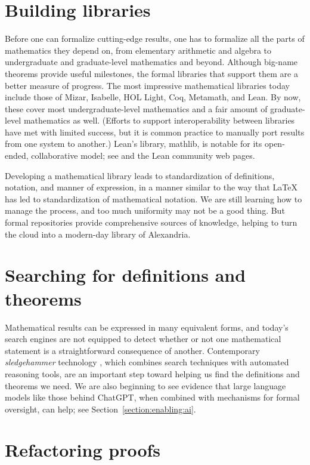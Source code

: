 \documentclass[12pt]{amsart}
\theoremstyle{definition}
\theoremstyle{remark}
\numberwithin{equation}{section}
\begin{document}
\section{Building libraries}

Before one can formalize cutting-edge results, one has to formalize all the parts of mathematics they depend on, from elementary arithmetic and algebra to undergraduate and graduate-level mathematics and beyond. Although big-name theorems provide useful milestones, the formal libraries that support them are a better measure of progress. The most impressive mathematical libraries today include those of Mizar, Isabelle, HOL Light, Coq, Metamath, and Lean. By now, these cover most undergraduate-level mathematics and a fair amount of graduate-level mathematics as well. (Efforts to support interoperability between libraries have met with limited success, but it is common practice to manually port results from one system to another.) Lean's library, mathlib, is notable for its open-ended, collaborative model; see \cite{mathlib:20} and the Lean community web pages.

Developing a mathematical library leads to standardization of definitions, notation, and manner of expression, in a manner similar to the way that \LaTeX{} has led to standardization of mathematical notation. We are still learning how to manage the process, and too much uniformity may not be a good thing. But formal repositories provide comprehensive sources of knowledge, helping to turn the cloud into a modern-day library of Alexandria.


\section{Searching for definitions and theorems}

Mathematical results can be expressed in many equivalent forms, and today's search engines are not equipped to detect whether or not one mathematical statement is a straightforward consequence of another. Contemporary \emph{sledgehammer} technology \cite{desharnais:et:al:22}, which combines search techniques with automated reasoning tools, are an important step toward helping us find the definitions and theorems we need. We are also beginning to see evidence that large language models like those behind ChatGPT, when combined with mechanisms for formal oversight, can help; see Section~\ref{section:enabling:ai}.


\section{Refactoring proofs}
\end{document}
